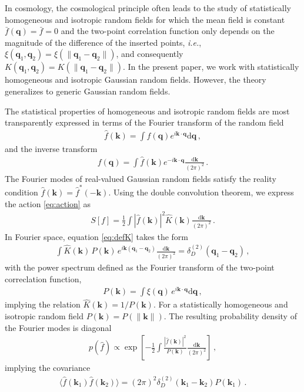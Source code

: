 \documentclass[a4paper, 11pt]{article}
\begin{document}
In cosmology, the cosmological principle often leads to the study of statistically homogeneous and isotropic random fields for which the mean field is constant $\bar{f}(\bm{q})=\bar{f}=0$ and the two-point correlation function only depends on the magnitude of the difference of the inserted points, \textit{i.e.}, $\xi(\bm{q}_1,\bm{q}_2)=\xi(\|\bm{q}_1-\bm{q}_2\|)$, and consequently $K(\bm{q}_1,\bm{q}_2)=K(\|\bm{q}_1-\bm{q}_2\|)$. In the present paper, we work with statistically homogeneous and isotropic Gaussian random fields. However, the theory generalizes to generic Gaussian random fields.

The statistical properties of homogeneous and isotropic random fields are most transparently expressed in terms of the Fourier transform of the random field
\begin{align}
\hat{f}(\bm{k}) = \int f(\bm{q})e^{i\bm{k}\cdot \bm{q}}\mathrm{d}\bm{q}\,,
\end{align}
and the inverse transform
\begin{align}
f(\bm{q}) = \int \hat{f}(\bm{k})e^{-i \bm{k} \cdot \bm{q}}\frac{\mathrm{d}\bm{k}}{(2\pi)^2}\,.
\end{align}
The Fourier modes of real-valued Gaussian random fields satisfy the reality condition $\hat{f}(\bm{k}) = \hat{f}^*(-\bm{k})$. Using the double convolution theorem, we express the action \eqref{eq:action} as
\begin{align}
S[f] = \frac{1}{2} \int |\hat{f}(\bm{k})|^2 \hat{K}(\bm{k}) \frac{\mathrm{d}\bm{k}}{(2\pi)^2}\,.
\end{align}
In Fourier space, equation \eqref{eq:defK} takes the form
\begin{align}
\int \hat{K}(\bm{k})\, P(\bm{k})\, e^{i\bm{k}(\bm{q}_1-\bm{q}_2)} \frac{\mathrm{d}\bm{k}}{(2\pi)^2} = \delta_D^{(2)}(\bm{q}_1 - \bm{q}_2)\,,
\end{align}
with the power spectrum defined as the Fourier transform of the two-point correclation function,
\begin{align}
P(\bm{k}) = \int \xi(\bm{q}) \, e^{i\bm{k}\cdot \bm{q}}\mathrm{d}\bm{q}\,,
\end{align}
implying the relation $\hat{K}(\bm{k}) = 1/P(\bm{k})$. For a statistically homogeneous and isotropic random field $P(\bm{k})=P(\|\bm{k}\|)$. The resulting probability density of the Fourier modes is diagonal
\begin{align}
p(\hat{f}) \propto \exp\left[ -\frac{1}{2} \int \frac{|\hat{f}(\bm{k})|^2}{P(\bm{k})} \frac{\mathrm{d}\bm{k}}{(2\pi)^2}\right]\,,
\end{align}
implying the covariance
\begin{align}
\langle \hat{f}(\bm{k}_1)\hat{f}(\bm{k}_2) \rangle = (2\pi)^2 \delta_D^{(2)}(\bm{k}_1-\bm{k}_2) P(\bm{k}_1)\,.
\end{align}
\end{document}
